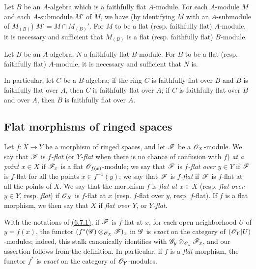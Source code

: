 \begin{env}[6.6.3]
\label{0.6.6.3}
Let $B$ be an $A$-algebra which is a faithfully flat $A$-module. For each $A$-module $M$ and
each $A$-submodule $M'$ of $M$, we have (by identifying $M$ with an $A$-submodule of
$M_{(B)}$) $M'=M\cap M_{(B)}'$. For $M$ to be a flat (resp. faithfully flat) $A$-module, it
is necessary and sufficient that $M_{(B)}$ is a flat (resp. faithfully flat) $B$-module.
\end{env}

\begin{env}[6.6.4]
\label{0.6.6.4}
Let $B$ be an $A$-algebra, $N$ a faithfully flat $B$-module. For $B$ to be a flat
(resp. faithfully flat) $A$-module, it is necessary and sufficient that $N$ is.

In particular, let $C$ be a $B$-algebra; if the ring $C$ is faithfully flat over $B$ and $B$
is faithfully flat over $A$, then $C$ is faithfully flat over $A$; if $C$ is faithfully flat
over $B$ and over $A$, then $B$ is faithfully flat over $A$.
\end{env}

\subsection{Flat morphisms of ringed spaces}
\label{subsection-flat-morphisms-of-ringed-spaces}

\begin{env}[6.7.1]
\label{0.6.7.1}
Let $f:X\to Y$ be a morphism of ringed spaces, and let $\mathscr{F}$ be a $\mathscr{O}_X$-module. We say
that $\mathscr{F}$ is {\em $f$-flat} (or {\em $Y$-flat} when there is no chance of confusion
with $f$) {\em at a point $x\in X$} if $\mathscr{F}_x$ is a flat $\mathscr{O}_{f(x)}$-module; we say that
$\mathscr{F}$ is {\em $f$-flat over $y\in Y$} if $\mathscr{F}$ is $f$-flat for all the points
$x\in f^{-1}(y)$; we say that $\mathscr{F}$ is {\em $f$-flat} if $\mathscr{F}$ is $f$-flat at all the
points of $X$. We say that the morphism $f$ is {\em flat at $x\in X$} (resp. {\em flat over
$y\in Y$}, resp. {\em flat}) if $\mathscr{O}_X$ is $f$-flat at $x$ (resp. $f$-flat over $y$, resp.
$f$-flat). If $f$ is a flat morphism, we then say that $X$ if {\em flat over $Y$}, or
{\em $Y$-flat}.
\end{env}

\begin{env}[6.7.2]
\label{0.6.7.2}
With the notations of \hyperref[0.6.7.1]{(6.7.1)}, if $\mathscr{F}$ is $f$-flat at $x$, for each open
neighborhood $U$ of $y=f(x)$, the functor $(f^*(\mathscr{G})\otimes_{\mathscr{O}_X}\mathscr{F})_x$ in $\mathscr{G}$
is {\em exact} on the category of $(\mathscr{O}_Y|U)$-modules; indeed, this stalk canonically
identifies with $\mathscr{G}_y\otimes_{\mathscr{O}_y}\mathscr{F}_x$, and our assertion follows from the
definition. In particular, if $f$ is a {\em flat} morphism, the functor $f^*$ is
{\em exact} on the category of $\mathscr{O}_Y$-modules.
\end{env}

